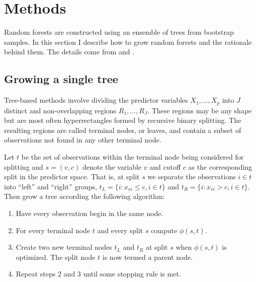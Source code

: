 \section{Methods}

Random forests are constructed using an ensemble of trees from bootstrap samples. In this section I describe how to grow random forests and the rationale behind them. The details come from \cite{segal:2011} and \cite{james:2013}.

\subsection{Growing a single tree}

Tree-based methods involve dividing the predictor variables $X_1,\ldots,X_p$ into $J$ distinct and non-overlapping regions $R_1,\ldots,R_J$. These regions may be any shape but are most often hyperrectangles formed by recursive binary splitting. The resulting regions are called terminal nodes, or leaves, and contain a subset of observations not found in any other terminal node.

Let $t$ be the set of observations within the terminal node being considered for splitting and $s=(v, c)$ denote the variable $v$ and cutoff $c$ as the corresponding split in the predictor space. That is, at split $s$ we separate the observations $i\in t$ into ``left'' and ``right'' groups, $t_L=\{i:x_{vi}\leq c, i\in t\}$ and $t_R=\{i:x_{vi} > c, i\in t\}$. Then grow a tree according the following algorithm:

\begin{enumerate}
\item Have every observation begin in the same node.
\item For every terminal node $t$ and every split $s$ compute $\phi(s, t)$.
\item Create two new terminal nodes $t_L$ and $t_R$ at split $s$ when $\phi(s, t)$ is optimized. The split node $t$ is now termed a parent node.
\item Repeat steps 2 and 3 until some stopping rule is met.%
\end{enumerate}


